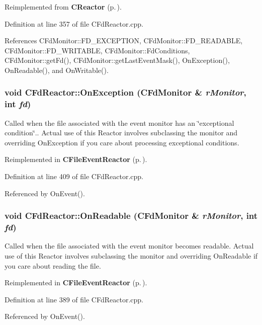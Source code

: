 Reimplemented from {\bf CReactor} {\rm (p.\,\pageref{classCReactor_a6})}.

Definition at line 357 of file CFd\-Reactor.cpp.

References CFd\-Monitor::FD\_\-EXCEPTION, CFd\-Monitor::FD\_\-READABLE, CFd\-Monitor::FD\_\-WRITABLE, CFd\-Monitor::Fd\-Conditions, CFd\-Monitor::get\-Fd(), CFd\-Monitor::get\-Last\-Event\-Mask(), On\-Exception(), On\-Readable(), and On\-Writable().
\subsubsection{\setlength{\rightskip}{0pt plus 5cm}void CFd\-Reactor::On\-Exception ({\bf CFd\-Monitor} \& {\em r\-Monitor}, int {\em fd})\hspace{0.3cm}{\tt  [virtual]}}\label{classCFdReactor_a8}


Called when the file associated with the event monitor has an \char`\"{}exceptional condition\char`\"{}.. Actual use of this Reactor involves subclassing the monitor and overriding On\-Exception if you care about processing exceptional conditions. 

Reimplemented in {\bf CFile\-Event\-Reactor} {\rm (p.\,\pageref{classCFileEvent_1_1CFileEventReactor_a4})}.

Definition at line 409 of file CFd\-Reactor.cpp.

Referenced by On\-Event().
\subsubsection{\setlength{\rightskip}{0pt plus 5cm}void CFd\-Reactor::On\-Readable ({\bf CFd\-Monitor} \& {\em r\-Monitor}, int {\em fd})\hspace{0.3cm}{\tt  [virtual]}}\label{classCFdReactor_a6}


Called when the file associated with the event monitor becomes readable. Actual use of this Reactor involves subclassing the monitor and overriding On\-Readable if you care about reading the file. 

Reimplemented in {\bf CFile\-Event\-Reactor} {\rm (p.\,\pageref{classCFileEvent_1_1CFileEventReactor_a2})}.

Definition at line 389 of file CFd\-Reactor.cpp.

Referenced by On\-Event().
